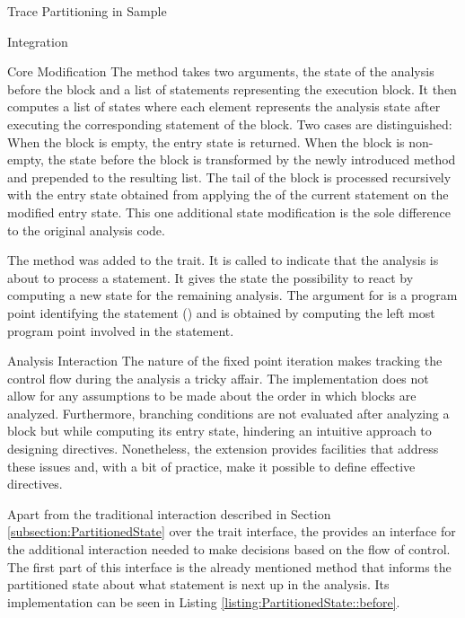 \begin{chapter}{Trace Partitioning in Sample}
\begin{section}{Integration}
\begin{subsection}{Core Modification}
			The method takes two arguments, the state of the analysis before the block and a list of statements representing the execution block. It then computes a list of states where each element represents the analysis state after executing the corresponding statement of the block. Two cases are distinguished: When the block is empty, the entry state is returned. When the block is non-empty, the state before the block is transformed by the newly introduced  method and prepended to the resulting list. The tail of the block is processed recursively with the entry state obtained from applying the  of the current statement on the modified entry state. This one additional state modification is the sole difference to the original analysis code.

			The  method was added to the  trait. It is called to indicate that the analysis is about to process a statement. It gives the state the possibility to react by computing a new state for the remaining analysis. The argument for  is a program point identifying the statement () and is obtained by computing the left most program point involved in the statement.
		\end{subsection}


		\begin{subsection}{Analysis Interaction}
			The nature of the fixed point iteration makes tracking the control flow during the analysis a tricky affair. The implementation does not allow for any assumptions to be made about the order in which blocks are analyzed. Furthermore, branching conditions are not evaluated after analyzing a block but while computing its entry state, hindering an intuitive approach to designing directives. Nonetheless, the extension provides facilities that address these issues and, with a bit of practice, make it possible to define effective directives.

			Apart from the traditional interaction described in Section \ref{subsection:PartitionedState} over the  trait interface, the  provides an interface for the additional interaction needed to make decisions based on the flow of control. The first part of this interface is the already mentioned  method that informs the partitioned state about what statement is next up in the analysis. Its implementation can be seen in Listing \ref{listing:PartitionedState::before}.


\end{subsection}
\end{section}
\end{chapter}
